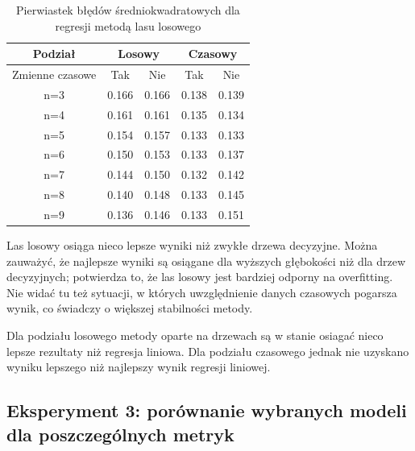 \documentclass[18pt, letterpaper]{article}
\begin{document}
\begin{table}[H]
\centering
\begin{tabular}{|c|cc|cc|}
\hline
Podział         & \multicolumn{2}{c|}{Losowy}        & \multicolumn{2}{c|}{Czasowy}       \\ \hline
Zmienne czasowe & \multicolumn{1}{c|}{Tak}   & Nie   & \multicolumn{1}{c|}{Tak}   & Nie   \\ \hline
n=3             & \multicolumn{1}{c|}{0.166} & 0.166 & \multicolumn{1}{c|}{0.138} & 0.139 \\ \hline
n=4             & \multicolumn{1}{c|}{0.161} & 0.161 & \multicolumn{1}{c|}{0.135} & 0.134 \\ \hline
n=5             & \multicolumn{1}{c|}{0.154} & 0.157 & \multicolumn{1}{c|}{0.133} & 0.133 \\ \hline
n=6             & \multicolumn{1}{c|}{0.150} & 0.153 & \multicolumn{1}{c|}{0.133} & 0.137 \\ \hline
n=7             & \multicolumn{1}{c|}{0.144} & 0.150 & \multicolumn{1}{c|}{0.132} & 0.142 \\ \hline
n=8             & \multicolumn{1}{c|}{0.140} & 0.148 & \multicolumn{1}{c|}{0.133} & 0.145 \\ \hline
n=9             & \multicolumn{1}{c|}{0.136} & 0.146 & \multicolumn{1}{c|}{0.133} & 0.151 \\ \hline
\end{tabular}
\caption{Pierwiastek błędów średniokwadratowych dla regresji metodą lasu losowego}
\label{table:forest_results}
\end{table}

Las losowy osiąga nieco lepsze wyniki niż zwykłe drzewa decyzyjne. Można zauważyć, że najlepsze wyniki są osiągane dla wyższych głębokości niż dla drzew decyzyjnych; potwierdza to, że las losowy jest bardziej odporny na overfitting. Nie widać tu też sytuacji, w których uwzględnienie danych czasowych pogarsza wynik, co świadczy o większej stabilności metody.

Dla podziału losowego metody oparte na drzewach są w stanie osiagać nieco lepsze rezultaty niż regresja liniowa. Dla podziału czasowego jednak nie uzyskano wyniku lepszego niż najlepszy wynik regresji liniowej.

\subsection{Eksperyment 3: porównanie wybranych modeli dla poszczególnych metryk}
\end{document}
